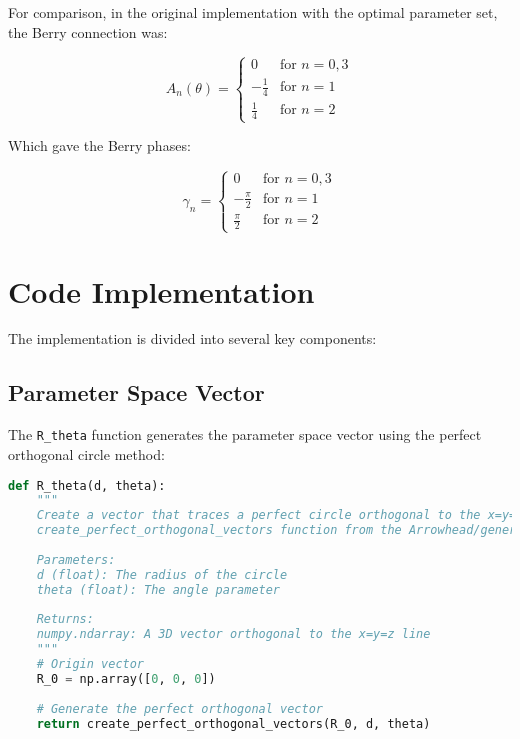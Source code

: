\documentclass[12pt,a4paper]{article}
\begin{document}
For comparison, in the original implementation with the optimal parameter set, the Berry connection was:

\begin{equation}
A_n(\theta) = \begin{cases}
0 & \text{for } n = 0, 3 \\
-\frac{1}{4} & \text{for } n = 1 \\
\frac{1}{4} & \text{for } n = 2
\end{cases}
\end{equation}

Which gave the Berry phases:

\begin{equation}
\gamma_n = \begin{cases}
0 & \text{for } n = 0, 3 \\
-\frac{\pi}{2} & \text{for } n = 1 \\
\frac{\pi}{2} & \text{for } n = 2
\end{cases}
\end{equation}

\section{Code Implementation}

The implementation is divided into several key components:

\subsection{Parameter Space Vector}

The \texttt{R\_theta} function generates the parameter space vector using the perfect orthogonal circle method:

\begin{lstlisting}[language=Python, caption=R\_theta function]
def R_theta(d, theta):
    """
    Create a vector that traces a perfect circle orthogonal to the x=y=z line using the
    create_perfect_orthogonal_vectors function from the Arrowhead/generalized package.
    
    Parameters:
    d (float): The radius of the circle
    theta (float): The angle parameter
    
    Returns:
    numpy.ndarray: A 3D vector orthogonal to the x=y=z line
    """
    # Origin vector
    R_0 = np.array([0, 0, 0])
    
    # Generate the perfect orthogonal vector
    return create_perfect_orthogonal_vectors(R_0, d, theta)
\end{lstlisting}
\end{document}
